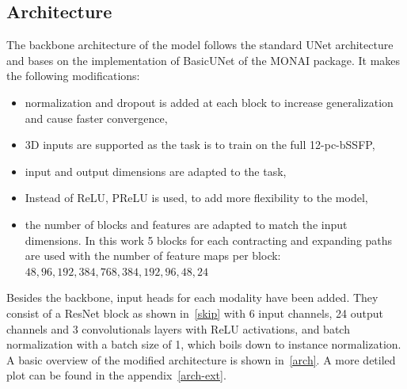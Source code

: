 \subsection{Architecture}
The backbone architecture of the model follows the standard UNet architecture and bases on the implementation of BasicUNet of the MONAI package.
It makes the following modifications:
\begin{itemize}
 \item normalization and dropout is added at each block to increase generalization and cause faster convergence,
 \item 3D inputs are supported as the task is to train on the full 12-pc-bSSFP,
 \item input and output dimensions are adapted to the task,
 \item Instead of ReLU, PReLU is used, to add more flexibility to the model,
 \item the number of blocks and features are adapted to match the input dimensions. In this work 5 blocks for each contracting and expanding paths are used with the number of feature maps per block: $48, 96, 192, 384, 768, 384, 192, 96, 48, 24$
\end{itemize}
Besides the backbone, input heads for each modality have been added.
They consist of a ResNet block as shown in~\ref{skip} with 6 input channels, 24 output channels and 3 convolutionals layers with ReLU activations, and batch normalization with a batch size of 1, which boils down to instance normalization.
A basic overview of the modified architecture is shown in~\ref{arch}.
A more detiled plot can be found in the appendix~\ref{arch-ext}.

